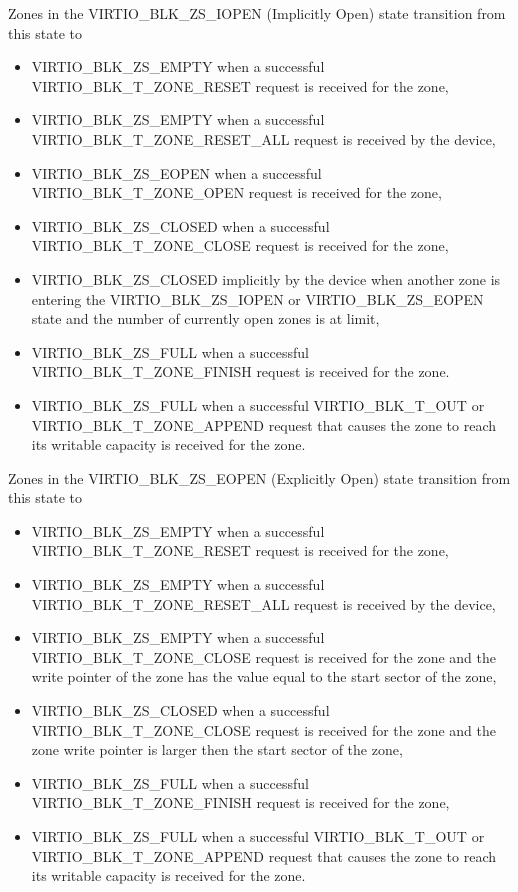 Zones in the VIRTIO_BLK_ZS_IOPEN (Implicitly Open) state transition from
this state to
\begin{itemize}
\item VIRTIO_BLK_ZS_EMPTY when a successful VIRTIO_BLK_T_ZONE_RESET request is
    received for the zone,

\item VIRTIO_BLK_ZS_EMPTY when a successful VIRTIO_BLK_T_ZONE_RESET_ALL request
    is received by the device,

\item VIRTIO_BLK_ZS_EOPEN when a successful VIRTIO_BLK_T_ZONE_OPEN request is
    received for the zone,

\item VIRTIO_BLK_ZS_CLOSED when a successful VIRTIO_BLK_T_ZONE_CLOSE request is
    received for the zone,

\item VIRTIO_BLK_ZS_CLOSED implicitly by the device when another zone is
    entering the VIRTIO_BLK_ZS_IOPEN or VIRTIO_BLK_ZS_EOPEN state and the number
    of currently open zones is at  limit,

\item VIRTIO_BLK_ZS_FULL when a successful VIRTIO_BLK_T_ZONE_FINISH request is
    received for the zone.

\item VIRTIO_BLK_ZS_FULL when a successful VIRTIO_BLK_T_OUT or
    VIRTIO_BLK_T_ZONE_APPEND request that causes the zone to reach its writable
    capacity is received for the zone.
\end{itemize}

Zones in the VIRTIO_BLK_ZS_EOPEN (Explicitly Open) state transition from
this state to
\begin{itemize}
\item VIRTIO_BLK_ZS_EMPTY when a successful VIRTIO_BLK_T_ZONE_RESET request is
    received for the zone,

\item VIRTIO_BLK_ZS_EMPTY when a successful VIRTIO_BLK_T_ZONE_RESET_ALL request
    is received by the device,

\item VIRTIO_BLK_ZS_EMPTY when a successful VIRTIO_BLK_T_ZONE_CLOSE request is
    received for the zone and the write pointer of the zone has the value equal
    to the start sector of the zone,

\item VIRTIO_BLK_ZS_CLOSED when a successful VIRTIO_BLK_T_ZONE_CLOSE request is
    received for the zone and the zone write pointer is larger then the start
    sector of the zone,

\item VIRTIO_BLK_ZS_FULL when a successful VIRTIO_BLK_T_ZONE_FINISH request is
    received for the zone,

\item VIRTIO_BLK_ZS_FULL when a successful VIRTIO_BLK_T_OUT or
    VIRTIO_BLK_T_ZONE_APPEND request that causes the zone to reach its writable
    capacity is received for the zone.
\end{itemize}


